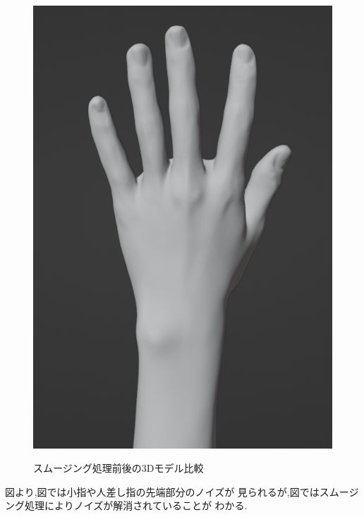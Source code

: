 \documentclass{ltjsreport}
\begin{document}
\begin{figure}[H]
		\hspace{0.04\columnwidth}
		\begin{minipage}{0.32\columnwidth}
		\centering
		\includegraphics[width = \columnwidth]{../figs/SmoothingAfterRear.png}
		\label{fig:smoothingafter}
		\end{minipage}
		\caption{スムージング処理前後の3Dモデル比較}
		\label{fig:smoothing}
		\end{figure}

		図より,図では小指や人差し指の先端部分のノイズが
		見られるが,図ではスムージング処理によりノイズが解消されていることが
		わかる.
\end{document}
